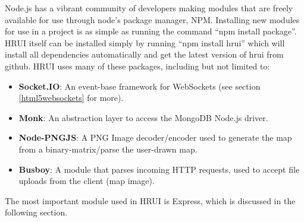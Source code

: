 Node.js has a vibrant community of developers making modules that are freely available for use through node's package manager,
NPM. Installing new modules for use in a project is as simple as running the command ``npm install package''. HRUI itself can
be installed simply by running ``npm install hrui'' which will install all dependencies automatically and get the latest
version of hrui from github. HRUI uses many of these packages, including but not limited to:
\begin{itemize}
  \item \textbf{Socket.IO}: An event-base framework for WebSockets (see section \ref{html5websockets} for more)\cite{socketio15}.
  \item \textbf{Monk}: An abstraction layer to access the MongoDB Node.js driver\cite{monk12}.
  \item \textbf{Node-PNGJS}: A PNG Image decoder/encoder used to generate the map from a binary-matrix/parse the user-drawn map.\cite{nodepngjs12}
  \item \textbf{Busboy}: A module that parses incoming HTTP requests, used to accept file uploads from the client (map image).\cite{busboy13}
\end{itemize}
The most important module used in HRUI is Express, which is discussed in the following section.
